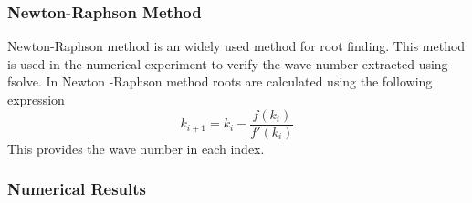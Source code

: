 \subsubsection*{Newton-Raphson Method}
Newton-Raphson method is an widely used method for root finding. This method is used in the numerical experiment to verify the wave number extracted using fsolve. In Newton -Raphson method roots are calculated using the following expression
\begin{equation*}
k_{i+1}=k_{i}-\frac{f(k_{i})}{f'(k_{i})}
\end{equation*}
This provides the wave number in each index.
\subsubsection{Numerical Results}